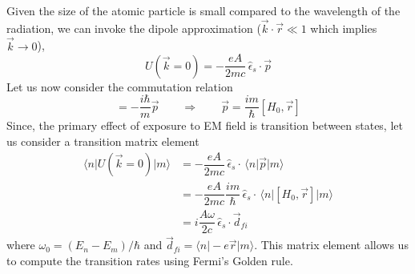 \documentclass[aps,prb,onecolumn,notitlepage,showpacs,floatfix,superscriptaddress]{revtex4-1}
\begin{document}
Given the size of the atomic particle is small compared to the wavelength of the radiation, we can invoke the dipole approximation ($\vec{k}\cdot \vec{r} \ll 1$ which implies $\vec{k} \rightarrow 0$),
\begin{equation}
U(\vec{k} = 0) = - \dfrac{eA}{2 m c} \, \hat{\epsilon}_s \cdot \vec{p}
\end{equation}
Let us now consider the commutation relation
\begin{equation}
[H_0, \vec{r}] = - \dfrac{i\hbar}{m} \vec{p} \qquad \Rightarrow \qquad \vec{p} = \dfrac{im}{\hbar} [H_0, \vec{r}] 
\end{equation}
Since, the primary effect of exposure to EM field is transition between states, let us consider a transition matrix element
\begin{equation}
\begin{split}
\langle n \vert U(\vec{k} = 0) \vert m \rangle &= - \dfrac{eA}{2 m c} \, \hat{\epsilon}_s \cdot  \, \langle n \vert \vec{p} \vert m \rangle \\
&= - \dfrac{eA}{2 m c} \dfrac{im}{\hbar} \, \hat{\epsilon}_s \cdot  \, \langle n \vert [H_0, \vec{r}] \vert m \rangle \\
&= i \dfrac{A \omega}{2c} \, \hat{\epsilon}_s \cdot \vec{d}_{fi}
\end{split}
\end{equation}
where $\omega_0 = (E_n-E_m)/\hbar$ and $\vec{d}_{fi} = \langle n \vert -e \vec{r} \vert m \rangle$. This matrix element allows us to compute the transition rates using Fermi's Golden rule.
\end{document}
